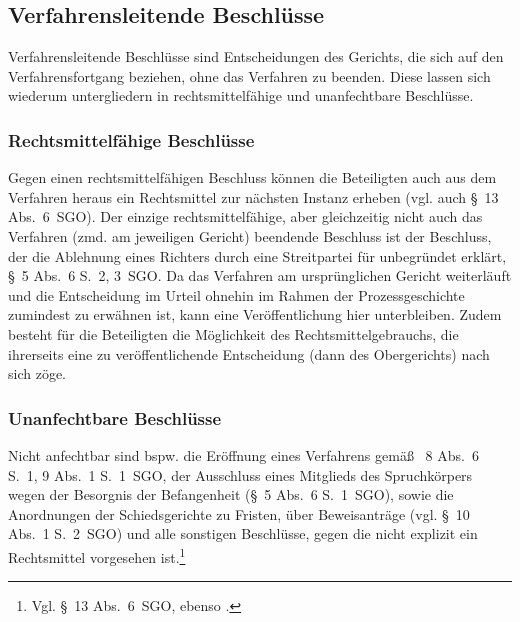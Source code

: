 \subsection{Verfahrensleitende Beschlüsse}
\label{Dokumentation:Beschlüsse:Verfahrensleitend}
Verfahrensleitende Beschlüsse sind Entscheidungen des Gerichts, die sich auf den Verfahrensfortgang beziehen, ohne das Verfahren zu beenden.
Diese lassen sich wiederum untergliedern in rechtsmittelfähige und unanfechtbare Beschlüsse.

\subsubsection{Rechtsmittelfähige Beschlüsse}
\label{Dokumentation:Beschlüsse:Verfahrensleitend:Rechtsmittelfähig}
Gegen einen rechtsmittelfähigen Beschluss können die Beteiligten auch aus dem Verfahren heraus ein Rechtsmittel zur nächsten Instanz erheben (vgl. auch \S~13 Abs.~6~SGO).
Der einzige rechtsmittelfähige, aber gleichzeitig nicht auch das Verfahren (zmd. am jeweiligen  Gericht) beendende Beschluss ist der Beschluss, der die Ablehnung eines Richters durch eine Streitpartei für unbegründet erklärt, \S~5 Abs.~6 S.~2, 3~SGO.
Da das Verfahren am ursprünglichen Gericht weiterläuft und die Entscheidung im Urteil ohnehin im Rahmen der Prozessgeschichte zumindest zu erwähnen ist, kann eine Veröffentlichung hier unterbleiben.
Zudem besteht für die Beteiligten die Möglichkeit des Rechtsmittelgebrauchs, die ihrerseits eine zu veröffentlichende Entscheidung (dann des Obergerichts) nach sich zöge. 

\subsubsection{Unanfechtbare Beschlüsse}
\label{Dokumentation:Beschlüsse:Verfahrensleitend:Unanfechtbar}
Nicht anfechtbar sind bspw. die Eröffnung eines Verfahrens gemäß \SSS~8 Abs.~6 S.~1, 9 Abs.~1 S.~1~SGO, der Ausschluss eines Mitglieds des Spruchkörpers wegen der Besorgnis der Befangenheit (\S~5 Abs.~6 S.~1~SGO), sowie die Anordnungen der Schiedsgerichte zu Fristen, über Beweisanträge (vgl. \S~10 Abs.~1 S.~2~SGO) und alle sonstigen Beschlüsse, gegen die nicht explizit ein Rechtsmittel vorgesehen ist.\footnote{Vgl. \S~13 Abs.~6~SGO, ebenso \cite[5]{LSGBB147}.}

